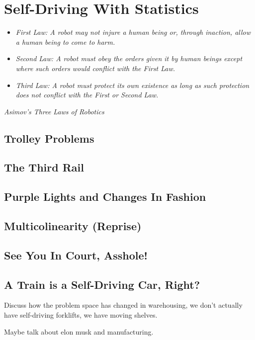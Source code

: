 \setchapterpreamble[u]{\margintoc}
\chapter{Self-Driving With Statistics}

\begin{itemize}
    \item\textit{First Law: A robot may not injure a human being or, through inaction, allow a human being to come to harm.}
    \item\textit{Second Law: A robot must obey the orders given it by human beings except where such orders would conflict with the First Law.}
    \item\textit{Third Law: A robot must protect its own existence as long as such protection does not conflict with the First or Second Law.}
\end{itemize} 
\textit{Asimov's Three Laws of Robotics}


\section{Trolley Problems}

\section{The Third Rail}

\section{Purple Lights and Changes In Fashion}

\section{Multicolinearity (Reprise)}

\section{See You In Court, Asshole!}

\section{A Train is a Self-Driving Car, Right?}

Discuss how the problem space has changed in warehousing, we don't actually have self-driving forklifts, we have moving shelves.

Maybe talk about elon musk and manufacturing.
